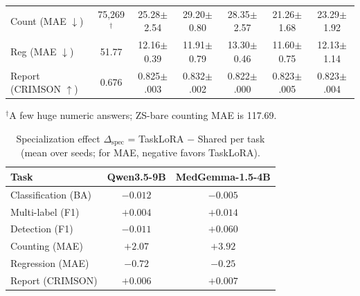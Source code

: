 \documentclass[journal,twoside,web]{ieeecolor}
\newcommand{\todo}[1]{\textcolor{red}{[TODO: #1]}}
\begin{document}
\begin{table}[!t]
\begin{tabular}{lcccccc}
Count (MAE $\downarrow$) & 75{,}269$^\dagger$ & 25.28{\scriptsize$\pm$2.54} & 29.20{\scriptsize$\pm$0.80} & 28.35{\scriptsize$\pm$2.57} & 21.26{\scriptsize$\pm$1.68} & 23.29{\scriptsize$\pm$1.92} \\
Reg (MAE $\downarrow$) & 51.77 & 12.16{\scriptsize$\pm$0.39} & 11.91{\scriptsize$\pm$0.79} & 13.30{\scriptsize$\pm$0.46} & 11.60{\scriptsize$\pm$0.75} & 12.13{\scriptsize$\pm$1.14} \\
Report (CRIMSON $\uparrow$) & 0.676 & 0.825{\scriptsize$\pm$.003} & 0.832{\scriptsize$\pm$.002} & 0.822{\scriptsize$\pm$.000} & 0.823{\scriptsize$\pm$.005} & 0.823{\scriptsize$\pm$.004} \\
\bottomrule
\end{tabular}

\vspace{2pt}
\parbox{\textwidth}{\footnotesize $^\dagger$A few huge numeric answers; ZS-bare counting MAE is 117.69.}
\end{table}

\begin{table}[!t]
\caption{Specialization effect $\Delta_{\mathrm{spec}}$ = TaskLoRA $-$
Shared per task (mean over seeds; for MAE, negative favors TaskLoRA).}
\label{tab:dspec}
\centering
\begin{tabular}{lcc}
\toprule
Task & Qwen3.5-9B & MedGemma-1.5-4B \\
\midrule
Classification (BA) & $-0.012$ & $-0.005$ \\
Multi-label (F1) & $+0.004$ & $+0.014$ \\
Detection (F1) & $-0.011$ & $+0.060$ \\
Counting (MAE) & $+2.07$ & $+3.92$ \\
Regression (MAE) & $-0.72$ & $-0.25$ \\
Report (CRIMSON) & $+0.006$ & $+0.007$ \\
\bottomrule
\end{tabular}
\end{table}
\end{document}
